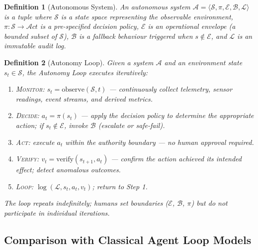 \documentclass[12pt, a4paper]{article}
\newtheorem{definition}{Definition}
\begin{document}
\begin{definition}[Autonomous System]
An autonomous system $\mathcal{A} = \langle \mathcal{S}, \pi, \mathcal{E}, \mathcal{B}, \mathcal{L} \rangle$ is a tuple where $\mathcal{S}$ is a state space representing the observable environment, $\pi: \mathcal{S} \rightarrow \mathcal{A}ct$ is a pre-specified decision policy, $\mathcal{E}$ is an operational envelope (a bounded subset of $\mathcal{S}$), $\mathcal{B}$ is a fallback behaviour triggered when $s \notin \mathcal{E}$, and $\mathcal{L}$ is an immutable audit log.
\end{definition}

\begin{definition}[Autonomy Loop]
Given a system $\mathcal{A}$ and an environment state $s_t \in \mathcal{S}$, the Autonomy Loop executes iteratively:
\begin{enumerate}
    \item \textsc{Monitor}: $s_t = \text{observe}(\mathcal{S}, t)$ --- continuously collect telemetry, sensor readings, event streams, and derived metrics.
    \item \textsc{Decide}: $a_t = \pi(s_t)$ --- apply the decision policy to determine the appropriate action; if $s_t \notin \mathcal{E}$, invoke $\mathcal{B}$ (escalate or safe-fail).
    \item \textsc{Act}: execute $a_t$ within the authority boundary --- no human approval required.
    \item \textsc{Verify}: $v_t = \text{verify}(s_{t+1}, a_t)$ --- confirm the action achieved its intended effect; detect anomalous outcomes.
    \item \textsc{Loop}: $\log(\mathcal{L}, s_t, a_t, v_t)$; return to Step 1.
\end{enumerate}
The loop repeats indefinitely; humans set boundaries ($\mathcal{E}$, $\mathcal{B}$, $\pi$) but do not participate in individual iterations.
\end{definition}

\subsection{Comparison with Classical Agent Loop Models}
\end{document}
